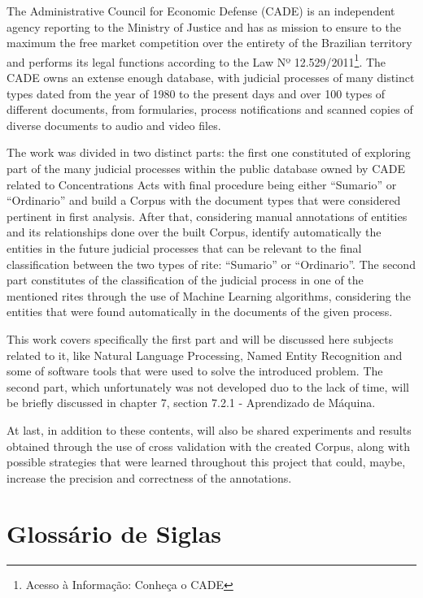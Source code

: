 \documentclass[11pt]{report}
\newcommand{\quotes}[1]{``#1''}
\begin{document}
\indent\indent The Administrative Council for Economic Defense (CADE) is an independent agency reporting to the Ministry of Justice and has as mission to ensure to the maximum the free
market competition over the entirety of the Brazilian territory and performs its legal functions according to the Law Nº 12.529/2011\footnote[2]{Acesso à Informação: Conheça o CADE}.
The CADE owns an extense enough database, with judicial processes of many distinct types dated from the year of 1980 to the present days and over 100 types of different documents,
from formularies, process notifications and scanned copies of diverse documents to audio and video files.

The work was divided in two distinct parts: the first one constituted of exploring part of the many judicial processes within the public database owned by CADE related to Concentrations
Acts with final procedure being either \quotes{Sumario} or \quotes{Ordinario} and build a Corpus with the document types that were considered pertinent in first analysis. After that,
considering manual annotations of entities and its relationships done over the built Corpus, identify automatically the entities in the future judicial processes that can be relevant
to the final classification between the two types of rite: \quotes{Sumario} or \quotes{Ordinario}. The second part constitutes of the classification of the judicial process in one of
the mentioned rites through the use of Machine Learning algorithms, considering the entities that were found automatically in the documents of the given process.

This work covers specifically the first part and will be discussed here subjects related to it, like Natural Language Processing, Named Entity Recognition and some of software tools that
were used to solve the introduced problem. The second part, which unfortunately was not developed duo to the lack of time, will be briefly discussed in chapter 7,
section 7.2.1 - Aprendizado de Máquina.

At last, in addition to these contents, will also be shared experiments and results obtained through the use of cross validation with the created Corpus, along with possible strategies that
were learned throughout this project that could, maybe, increase the precision and correctness of the annotations.

\pagebreak
\thispagestyle{empty}
\chapter*{Glossário de Siglas}
\end{document}
